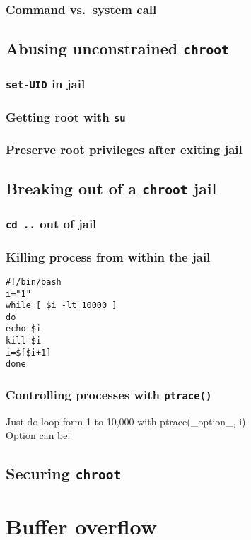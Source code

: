 \documentclass[12pt, a4paper, pdflatex]{article}
\begin{document}
\subsubsection{Command vs.\ system call}

\subsection{Abusing unconstrained \texttt{chroot}}
\subsubsection{\texttt{set-UID} in jail}

\subsubsection{Getting root with \texttt{su}}

\subsubsection{Preserve root privileges after exiting jail}

\subsection{Breaking out of a \texttt{chroot} jail}
\subsubsection{\texttt{cd ..} out of jail}

\subsubsection{Killing process from within the jail}
\vspace{1em}
\lstset{
  captionpos=b,
  frame=single,
  language=bash,
  caption=Kill processes outside of chroot jail.,
  label=chroot:kill
}
\begin{lstlisting}
#!/bin/bash
i="1"
while [ $i -lt 10000 ]
do
echo $i
kill $i
i=$[$i+1]
done
\end{lstlisting}

\subsubsection{Controlling processes with \texttt{ptrace()}}
Just do loop form 1 to 10,000 with ptrace(\_option\_, i)\\
Option can be: 

\subsection{Securing \texttt{chroot}}

\section{Buffer overflow}
\lipsum[3]
\end{document}
